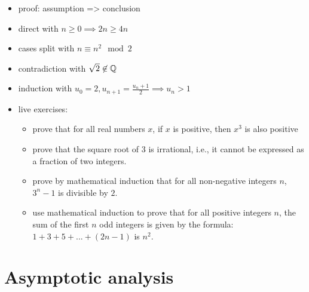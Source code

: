 \begin{itemize}
\tightlist
\item
  proof: assumption =\textgreater{} conclusion
\item
  direct with \(n \geq 0 \implies 2n \geq 4n\)
\item
  cases split with \(n \equiv n^2 \mod 2\)
\item
  contradiction with \(\sqrt{2} \not \in \mathbb{Q}\)
\item
  induction with \(u_0 = 2, u_{n+1} = \frac{u_n+1}{2} \implies u_n>1\)
\item
  live exercises:

  \begin{itemize}
  \tightlist
  \item
    prove that for all real numbers \(x\), if \(x\) is positive, then
    \(x^3\) is also positive
  \item
    prove that the square root of 3 is irrational, i.e., it cannot be
    expressed as a fraction of two integers.
  \item
    prove by mathematical induction that for all non-negative integers
    \(n\), \(3^n - 1\) is divisible by \(2\).
  \item
    use mathematical induction to prove that for all positive integers
    \(n\), the sum of the first \(n\) odd integers is given by the
    formula: \(1 + 3 + 5 + ... + (2n - 1)\) is \(n^2\).
  \end{itemize}
\end{itemize}

\hypertarget{asymptotic-analysis}{%
\section{Asymptotic analysis}\label{asymptotic-analysis}}

